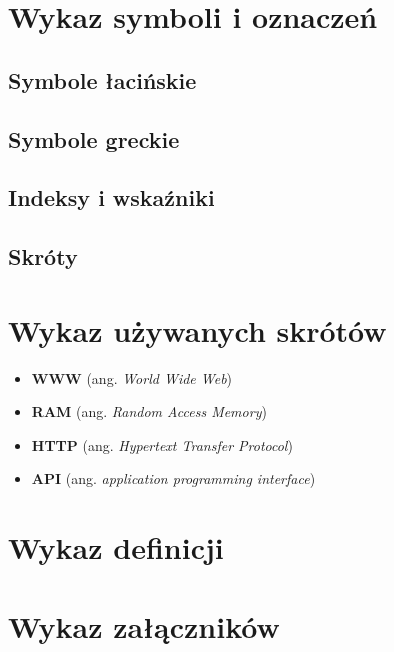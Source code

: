 \section*{Wykaz symboli i oznaczeń}
\subsection*{Symbole łacińskie}

\subsection*{Symbole greckie}

\subsection*{Indeksy i wskaźniki}

\subsection*{Skróty}


\printnomenclature

\newpage
\section*{Wykaz używanych skrótów}
\begin{itemize}
  \item \textbf{WWW} (ang. \textit{World Wide Web})
  \item \textbf{RAM} (ang. \textit{Random Access Memory})
  \item \textbf{HTTP} (ang. \textit{Hypertext Transfer Protocol})
  \item \textbf{API} (ang. \textit{application programming interface})
\end{itemize}

\newpage
\section*{Wykaz definicji}

\newpage
\section*{Wykaz załączników}

